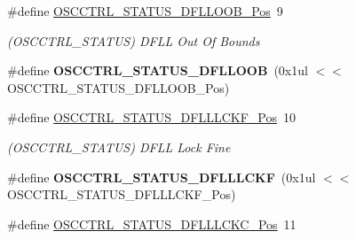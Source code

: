 \begin{DoxyCompactItemize}
\item 
\hypertarget{group___s_a_m_l21___o_s_c_c_t_r_l_ga609a88a7dd6e51e13db39120c06e7802}{}\#define \hyperlink{group___s_a_m_l21___o_s_c_c_t_r_l_ga609a88a7dd6e51e13db39120c06e7802}{O\+S\+C\+C\+T\+R\+L\+\_\+\+S\+T\+A\+T\+U\+S\+\_\+\+D\+F\+L\+L\+O\+O\+B\+\_\+\+Pos}~9\label{group___s_a_m_l21___o_s_c_c_t_r_l_ga609a88a7dd6e51e13db39120c06e7802}

\begin{DoxyCompactList}\small\item\em (O\+S\+C\+C\+T\+R\+L\+\_\+\+S\+T\+A\+T\+U\+S) D\+F\+L\+L Out Of Bounds \end{DoxyCompactList}\item 
\hypertarget{group___s_a_m_l21___o_s_c_c_t_r_l_gaa879c63e8680e41d244d09e2bd82d1ca}{}\#define {\bfseries O\+S\+C\+C\+T\+R\+L\+\_\+\+S\+T\+A\+T\+U\+S\+\_\+\+D\+F\+L\+L\+O\+O\+B}~(0x1ul $<$$<$ O\+S\+C\+C\+T\+R\+L\+\_\+\+S\+T\+A\+T\+U\+S\+\_\+\+D\+F\+L\+L\+O\+O\+B\+\_\+\+Pos)\label{group___s_a_m_l21___o_s_c_c_t_r_l_gaa879c63e8680e41d244d09e2bd82d1ca}

\item 
\hypertarget{group___s_a_m_l21___o_s_c_c_t_r_l_gab0f92bd1bac8899184a0c9e827cb893e}{}\#define \hyperlink{group___s_a_m_l21___o_s_c_c_t_r_l_gab0f92bd1bac8899184a0c9e827cb893e}{O\+S\+C\+C\+T\+R\+L\+\_\+\+S\+T\+A\+T\+U\+S\+\_\+\+D\+F\+L\+L\+L\+C\+K\+F\+\_\+\+Pos}~10\label{group___s_a_m_l21___o_s_c_c_t_r_l_gab0f92bd1bac8899184a0c9e827cb893e}

\begin{DoxyCompactList}\small\item\em (O\+S\+C\+C\+T\+R\+L\+\_\+\+S\+T\+A\+T\+U\+S) D\+F\+L\+L Lock Fine \end{DoxyCompactList}\item 
\hypertarget{group___s_a_m_l21___o_s_c_c_t_r_l_ga3dc7ccd063f29ed5baf42c6d441a5c03}{}\#define {\bfseries O\+S\+C\+C\+T\+R\+L\+\_\+\+S\+T\+A\+T\+U\+S\+\_\+\+D\+F\+L\+L\+L\+C\+K\+F}~(0x1ul $<$$<$ O\+S\+C\+C\+T\+R\+L\+\_\+\+S\+T\+A\+T\+U\+S\+\_\+\+D\+F\+L\+L\+L\+C\+K\+F\+\_\+\+Pos)\label{group___s_a_m_l21___o_s_c_c_t_r_l_ga3dc7ccd063f29ed5baf42c6d441a5c03}

\item 
\hypertarget{group___s_a_m_l21___o_s_c_c_t_r_l_ga1afa368e7e15936f20fc585a75ae2364}{}\#define \hyperlink{group___s_a_m_l21___o_s_c_c_t_r_l_ga1afa368e7e15936f20fc585a75ae2364}{O\+S\+C\+C\+T\+R\+L\+\_\+\+S\+T\+A\+T\+U\+S\+\_\+\+D\+F\+L\+L\+L\+C\+K\+C\+\_\+\+Pos}~11\label{group___s_a_m_l21___o_s_c_c_t_r_l_ga1afa368e7e15936f20fc585a75ae2364}


\end{DoxyCompactItemize}
